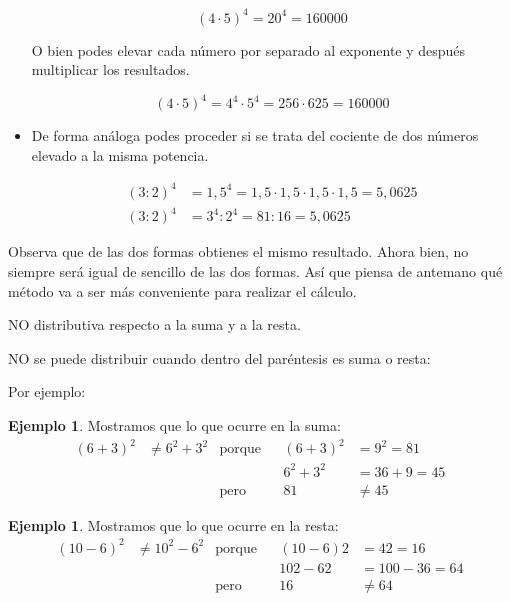 \documentclass[12pt]{examdesign}
\theoremstyle{plain}
\theoremstyle{definition}
\newtheorem{exa}[theorem]{Ejemplo}
\theoremstyle{remark}
\begin{document}
\begin{endmatter}
\begin{itemize}
	    	$$(4\cdot 5)^{4} = 20^{4}= 160000$$
	    	
	    	O bien podes elevar cada número por separado al exponente y después multiplicar los resultados.
	    	
	    	$$(4\cdot 5)^{4} = 4^{4}\cdot 5^{4} = 256\cdot 625 = 160000$$
	    	
	    	\item De forma análoga podes proceder si se trata del cociente de dos números elevado a la misma potencia.
	    	
	    	\begin{align*}
	    	(3 : 2)^{4} &= 1,5^{4} = 1,5\cdot 1,5\cdot 1,5\cdot 1,5= 5, 0625 \\
	    	(3 : 2)^{4} &= 3^{4} : 2^{4} = 81 : 16 = 5,0625
	    	\end{align*}
	    	
	    \end{itemize}
	    Observa que de las dos formas obtienes el mismo resultado. Ahora bien, no siempre será igual de sencillo de las dos formas. Así que piensa de antemano qué método va a ser más conveniente para realizar el cálculo.
	   
	    NO distributiva respecto a la suma y a la resta.
	   
	    NO se puede distribuir cuando dentro del paréntesis es suma o resta:
	   
	    Por ejemplo:
	   
	    \begin{exa} Mostramos que lo que ocurre en la suma:
	   	    \begin{align*}
	   	        (6 + 3)^{2} &\not= 6^{2} + 3^{2}&         \mbox{porque}&&              (6 + 3)^{2} &= 9^{2} = 81 \\
	   	                    &                   &                      &&            6^{2} + 3^{2} &= 36 + 9 = 45\\
	   	                    &                   &           \mbox{pero}&&                       81 &\not= 45
	   	    \end{align*}
 	    \end{exa}
     	   
	    \begin{exa}Mostramos que lo que ocurre en la resta:
	   	    \begin{align*}
        	   	(10 - 6)^{2} &\not= 10^{2} - 6^{2}&       \mbox{porque}&&             (10 - 6)2 &= 42 = 16\\
        	   	             &                    &                    &&             102 - 62  &= 100 - 36 = 64\\
        	   	             &                    &         \mbox{pero}&&                   16  &\not= 64
	   	    \end{align*}
	    \end{exa}
	   

\end{endmatter}
\end{document}
